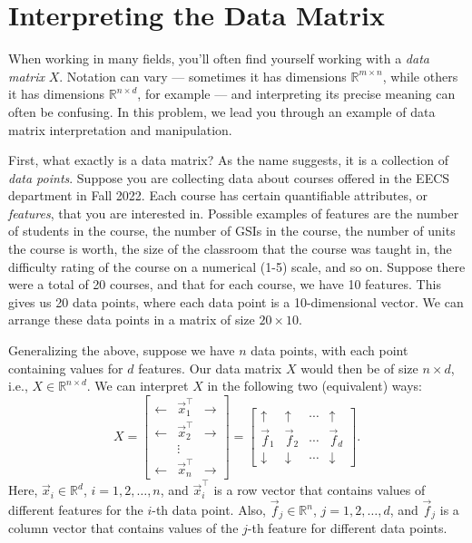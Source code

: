 \documentclass[10pt]{article}
\theoremstyle{definition}
\theoremstyle{plain}
\newcommand{\RR}{\mathbb{R}}
\begin{document}
\section{Interpreting the Data Matrix}

When working in many fields, you'll often find yourself working with a \textit{data matrix} $X$. Notation can vary --- sometimes it has dimensions $\RR^{m\times n}$, while others it has dimensions $\RR^{n\times d}$, for example --- and interpreting its precise meaning can often be confusing. In this problem, we lead you through an example of data matrix interpretation and manipulation.

First, what exactly is a data matrix? As the name suggests, it is a collection of \textit{data points}. Suppose you are collecting data about courses offered in the EECS department in Fall 2022. Each course has certain quantifiable attributes, or \textit{features}, that you are interested in. Possible examples of features are the number of students in the course, the number of GSIs in the course, the number of units the course is worth, the size of the classroom that the course was taught in, the difficulty rating of the course on a numerical (1-5) scale, and so on. Suppose there were a total of 20 courses, and that for each course, we have 10 features. This gives us 20 data points, where each data point is a 10-dimensional vector. We can arrange these data points in a matrix of size $20 \times 10$.

Generalizing the above, suppose we have $n$ data points, with each point containing values for $d$ features. Our data matrix $X$ would then be of size $n \times d$, i.e., $X \in \RR^{n \times d}$. We can interpret $X$ in the following two (equivalent) ways:
\begin{equation}
X = \begin{bmatrix} \leftarrow & \vec{x}_1^\top & \rightarrow \\ \leftarrow & \vec{x}_2^\top & \rightarrow \\ & \vdots & \\ \leftarrow & \vec{x}_n^\top & \rightarrow \end{bmatrix} = \begin{bmatrix} \uparrow & \uparrow & \cdots & \uparrow \\ \vec{f}_1 & \vec{f}_2 & \cdots & \vec{f}_d \\ \downarrow & \downarrow & \cdots & \downarrow \end{bmatrix}.
\end{equation}
Here, $\vec{x}_i \in \RR^d$, $i = 1, 2, \ldots, n$, and $\vec{x}_i^\top$ is a row vector that contains values of different features for the $i$-th data point. Also, $\vec{f}_j \in \RR^n$, $j = 1, 2, \ldots, d$, and $\vec{f}_j$ is a column vector that contains values of the $j$-th feature for different data points.
\end{document}

